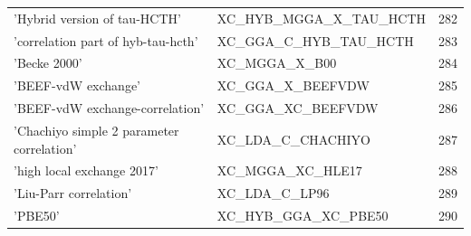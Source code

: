 \documentclass[final,12pt,makeidx,DIV=calc]{article}
\begin{document}
{{{\begin{table}[!h]
\begin{center}
\begin{tabular}{llr}
  'Hybrid version of tau-HCTH' & XC\_HYB\_MGGA\_X\_TAU\_HCTH  &282\\
  'correlation part of hyb-tau-hcth' & XC\_GGA\_C\_HYB\_TAU\_HCTH  &283\\
  'Becke 2000' & XC\_MGGA\_X\_B00  &284\\
  'BEEF-vdW exchange' & XC\_GGA\_X\_BEEFVDW  &285\\
  'BEEF-vdW exchange-correlation' & XC\_GGA\_XC\_BEEFVDW  &286\\
  'Chachiyo simple 2 parameter correlation' & XC\_LDA\_C\_CHACHIYO  &287\\
  'high local exchange 2017' & XC\_MGGA\_XC\_HLE17  &288\\
  'Liu-Parr correlation' & XC\_LDA\_C\_LP96  &289\\
  'PBE50' & XC\_HYB\_GGA\_XC\_PBE50  &290\\
\hline
\hline
\end{tabular}
\end{center}
\end{table}

}}}
\end{document}
